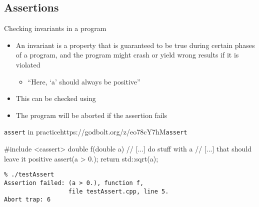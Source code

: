 \subsection[assert]{Assertions}

\begin{frame}[fragile]
  \begin{block}{Checking invariants in a program}
    \begin{itemize}
      \item An invariant is a property that is guaranteed to be true during certain phases of a program, and the program might crash or yield wrong results if it is violated
      \begin{itemize}
        \item ``Here, `a' should always be positive''
      \end{itemize}
      \item This can be checked using 
      \item The program will be aborted if the assertion fails
    \end{itemize}
  \end{block}
  \begin{exampleblockGB}{\texttt{assert} in practice}{https://godbolt.org/z/eo78cY7hM}{\texttt{assert}}
    \begin{overprint}
    \begin{cppcode*}{}
      #include <cassert>
      double f(double a) {
        // [...] do stuff with a
        // [...] that should leave it positive
        assert(a > 0.);
        return std::sqrt(a);
      }
    \end{cppcode*}
    \begin{Verbatim}
% ./testAssert
Assertion failed: (a > 0.), function f,
                  file testAssert.cpp, line 5.
Abort trap: 6
    \end{Verbatim}
    \end{overprint}
  \end{exampleblockGB}
\end{frame}


